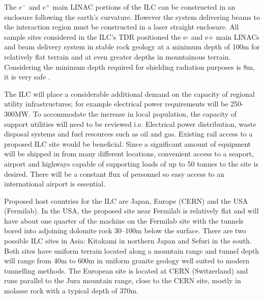 The $e^-$ and $e^+$ main LINAC portions of the ILC can be constructed in an enclosure following the earth’s curvature. However the system delivering beams to the interaction region must be constructed in a laser straight enclosure. All sample sites considered in the ILC’s TDR positioned the e- and e+ main LINACs and beam delivery system in stable rock geology at a minimum depth of 100m for relatively flat terrain and at even greater depths in mountainous terrain. Considering the minimum depth required for shielding radiation purposes is 8m, it is very safe \cite{ILC:PIPReport}.

The ILC will place a considerable additional demand on the capacity of regional utility infrastructures; for example electrical power requirements will be 250-300MW. To accommodate the increase in local population, the capacity of support utilities will need to be reviewed i.e. Electrical power distribution, waste disposal systems and fuel resources such as oil and gas. Existing rail access to a proposed ILC site would be beneficial. Since a significant amount of equipment will be shipped in from many different locations, convenient access to a seaport, airport and highways capable of supporting loads of up to 50 tonnes to the site is desired. There will be a constant flux of personnel so easy access to an international airport is essential.

Proposed host countries for the ILC are Japan, Europe (CERN) and the USA (Fermilab). In the USA, the proposed site near Fermilab is relatively ﬂat and will have about one quarter of the machine on the Fermilab site with the tunnels bored into adjoining dolomite rock 30–100m below the surface. There are two possible ILC sites in Asia: Kitakami in northern Japan and Sefuri in the south. Both sites have uniform terrain located along a mountain range and tunnel depth will range from 40m to 600m in uniform granite geology well suited to modern tunnelling methods. The European site is located at CERN (Switzerland) and runs parallel to the Jura mountain range, close to the CERN site, mostly in molasse rock with a typical depth of 370m. \cite{ILC:TechnicalDesignReport}


